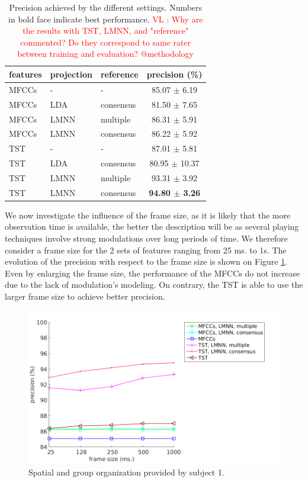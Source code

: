 \documentclass{article}
\newcommand{\vl}[1]{\textcolor{red}{VL : #1}}
\begin{document}
\begin{table}
  \caption{Precision achieved by the different settings. Numbers in bold face indicate best performance. \vl{Why are the results with TST, LMNN, and "reference" commented? Do they correspond to same rater between training and evaluation? @methodology}}
  \label{tab:res1}
  \begin{center}
\begin{tabular}{lllc}
features & projection & reference & precision (\%) \\
  \hline
  MFCCs & - & - &   85.07 $\pm$ 6.19 \\
  MFCCs & LDA &  consensus  &   81.50 $\pm$ 7.65 \\
MFCCs & LMNN & multiple & 86.31 $\pm$ 5.91 \\
MFCCs & LMNN & consensus &   86.22 $\pm$ 5.92 \\
TST & - & - &   87.01 $\pm$ 5.81 \\
TST & LDA & consensus &   80.95 $\pm$ 10.37 \\
TST & LMNN  & multiple  &   93.31 $\pm$ 3.92 \\
TST & LMNN & consensus &   \textbf{94.80 $\pm$ 3.26} \\
\end{tabular}
\end{center}
\end{table}

We now investigate the influence of the frame size, as it is likely that the more observation time is available, the better the description will be as several playing techniques involve strong modulations over long periods of time. We therefore consider a frame size for the 2 sets of features ranging from 25 ms. to 1s. The evolution of the precision with respect to the frame size is shown on Figure \ref{fig:frame}. Even by enlarging the frame size, the performance of the MFCCs do not increase due to the lack of modulation's modeling. On contrary, the TST is able to use the larger frame size to achieve better precision.

\begin{figure}
\center
\includegraphics[width = \textwidth]{figures/frame.png}
\caption{Spatial and group organization provided by subject 1.}
\label{fig:frame}
\end{figure}
\end{document}
